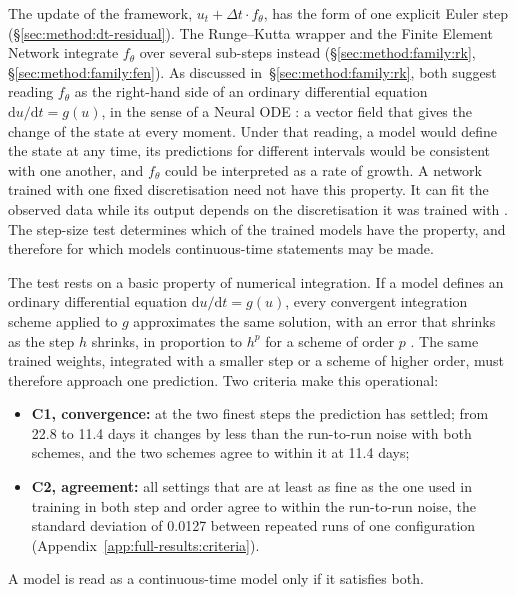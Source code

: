 The update of the framework, $u_t + \Delta t \cdot f_\theta$, has the form
of one explicit Euler step (\S\ref{sec:method:dt-residual}). The
Runge--Kutta wrapper and the Finite Element Network integrate $f_\theta$
over several sub-steps instead (\S\ref{sec:method:family:rk},
\S\ref{sec:method:family:fen}). As discussed in~\S\ref{sec:method:family:rk},
both suggest reading $f_\theta$ as the right-hand side of an ordinary
differential equation $\mathrm{d}u/\mathrm{d}t = g(u)$, in the sense of a
Neural ODE \citep{Chen2018}: a vector field that gives the change of the
state at every moment. Under that reading, a model would define the state
at any time, its predictions for different intervals would be consistent
with one another, and $f_\theta$ could be interpreted as a rate of growth.
A network trained with one fixed discretisation need not have this
property. It can fit the observed data while its output depends on the
discretisation it was trained with \citep{Ott2021, Krishnapriyan2023}. The
step-size test determines which of the trained models have the property,
and therefore for which models continuous-time statements may be made.

The test rests on a basic property of numerical integration. If a model
defines an ordinary differential equation
$\mathrm{d}u/\mathrm{d}t = g(u)$, every convergent integration scheme
applied to $g$ approximates the same solution, with an error that shrinks
as the step $h$ shrinks, in proportion to $h^p$ for a scheme of order $p$
\citep{Hairer1993}. The same trained weights, integrated with a smaller
step or a scheme of higher order, must therefore approach one prediction.
Two criteria make this operational:
\begin{itemize}
  \item \textbf{C1, convergence:} at the two finest steps the prediction
    has settled; from 22.8 to 11.4 days it changes by less than the
    run-to-run noise with both schemes, and the two schemes agree to within
    it at 11.4 days;
  \item \textbf{C2, agreement:} all settings that are at least as fine as
    the one used in training in both step and order agree to within the
    run-to-run noise, the standard deviation of 0.0127 between repeated runs of one
    configuration (Appendix~\ref{app:full-results:criteria}).
\end{itemize}
A model is read as a continuous-time model only if it satisfies both.

